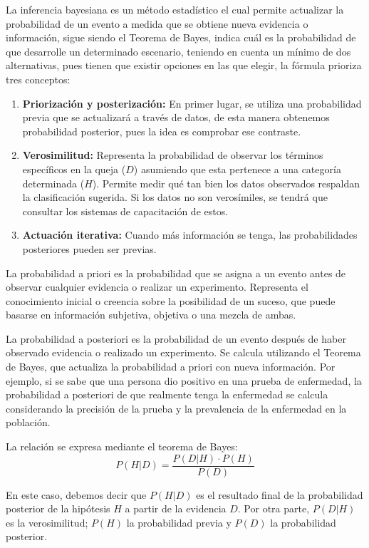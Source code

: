 La inferencia bayesiana es un método estadístico el cual permite actualizar la probabilidad de un evento a medida que se obtiene nueva evidencia o información, sigue siendo el Teorema de Bayes, indica cuál es la probabilidad de que desarrolle un determinado escenario, teniendo en cuenta un mínimo de dos alternativas, pues tienen que existir opciones en las que elegir, la fórmula prioriza tres conceptos:

\begin{enumerate}
\item \textbf{Priorización y posterización:} En primer lugar, se utiliza una probabilidad previa que se actualizará a través de datos, de esta manera obtenemos probabilidad posterior, pues la idea es comprobar ese contraste.
\item \textbf{Verosimilitud:} Representa la probabilidad de observar los términos específicos en la queja ($D$) asumiendo que esta pertenece a una categoría determinada ($H$). Permite medir qué tan bien los datos observados respaldan la clasificación sugerida. Si los datos no son verosímiles, se tendrá que consultar los sistemas de capacitación de estos.
\item \textbf{Actuación iterativa:} Cuando más información se tenga, las probabilidades posteriores pueden ser previas.
\end{enumerate}

La probabilidad a priori es la probabilidad que se asigna a un evento antes de observar cualquier evidencia o realizar un experimento. Representa el conocimiento inicial o creencia sobre la posibilidad de un suceso, que puede basarse en información subjetiva, objetiva o una mezcla de ambas.

La probabilidad a posteriori es la probabilidad de un evento después de haber observado evidencia o realizado un experimento. Se calcula utilizando el Teorema de Bayes, que actualiza la probabilidad a priori con nueva información. Por ejemplo, si se sabe que una persona dio positivo en una prueba de enfermedad, la probabilidad a posteriori de que realmente tenga la enfermedad se calcula considerando la precisión de la prueba y la prevalencia de la enfermedad en la población.

La relación se expresa mediante el teorema de Bayes:
\begin{equation}
P(H|D) = \frac{P(D|H) \cdot P(H)}{P(D)}
\end{equation}

En este caso, debemos decir que $P(H|D)$ es el resultado final de la probabilidad posterior de la hipótesis $H$ a partir de la evidencia $D$. Por otra parte, $P(D|H)$ es la verosimilitud; $P(H)$ la probabilidad previa y $P(D)$ la probabilidad posterior.

